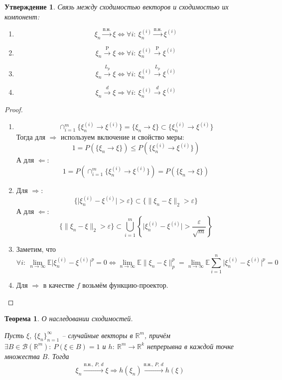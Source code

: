 \documentclass[a4paper,12pt]{article}
\renewcommand{\leq}{\ensuremath{\leqslant}}
\theoremstyle{plain}
\newtheorem{theorem}{Теорема}[section]
\newtheorem{proposition}{Утверждение}[section]
\theoremstyle{definition}
\theoremstyle{remark}
\begin{document}
\begin{proposition}
  Связь между сходимостью векторов и сходимостью их компонент:
  \begin{enumerate}
    \item \[
      \xi_n \overset{\text{п.н.}}{\to} \xi \Leftrightarrow \forall i :\: \xi_n^{(i)} \overset{\text{п.н.}}{\to} \xi^{(i)}
    \]
    \item \[
      \xi_n \overset{\text{P}}{\to} \xi \Leftrightarrow \forall i :\: \xi_n^{(i)} \overset{\text{P}}{\to} \xi^{(i)}
    \]
    \item \[
      \xi_n \overset{L_p}{\to} \xi \Leftrightarrow \forall i :\: \xi_n^{(i)} \overset{L_p}{\to} \xi^{(i)}
    \]
    \item \[
      \xi_n \overset{d}{\to} \xi \Rightarrow \forall i :\: \xi_n^{(i)} \overset{d}{\to} \xi^{(i)}
    \]
  \end{enumerate}
\end{proposition}

\begin{proof}
  \begin{enumerate}
    \item \[
      \cap_{i = 1}^m \{\xi_n^{(i)} \to \xi^{(i)}\} = \{\xi_n \to \xi\} \subset \{\xi_n^{(i)} \to \xi^{(i)}\}
    \]
    Тогда для $\Rightarrow$ используем включение и свойство меры:
    \[
      1 = P(\{\xi_n \to \xi\}) \leq P(\{\xi_n^{(i)} \to \xi^{(i)}\})
    \]
    А для $\Leftarrow$:
    \[
      1 = P(\cap_{i = 1}^m \{\xi_n^{(i)} \to \xi^{(i)}\}) = P(\{\xi_n \to \xi\})
    \]
    \item Для $\Rightarrow$:
    \[
      \{\vert \xi_n^{(i)} - \xi^{(i)}\vert > \varepsilon\} \subset \{\|\xi_n - \xi\|_2 > \varepsilon\}
    \]
    А для $\Leftarrow$:
    \[
      \{\|\xi_n - \xi\|_2 > \varepsilon\} \subset \bigcup_{i = 1}^m\left\{\vert \xi_n^{(i)} - \xi^{(i)}\vert > \frac{\varepsilon}{\sqrt{m}}\right\}
    \]
    \item Заметим, что
    \[
      \forall i :\: \lim_{n \to \infty}\mathbb{E}\vert \xi_n^{(i)} - \xi^{(i)}\vert^p = 0 \Leftrightarrow \lim_{n \to \infty}  \mathbb{E}\| \xi_n - \xi\|^p_p = \lim_{n \to \infty}  \mathbb{E}\sum_{i = 1}^n\vert \xi_n^{(i)} - \xi^{(i)}\vert^p = 0 
    \]
    \item Для $\Rightarrow$ в качестве $f$ возьмём функцию-проектор.
  \end{enumerate}
\end{proof}

\begin{theorem}
  О наследовании сходимостей.

  Пусть $\xi,\, \{\xi_n\}_{n = 1}^\infty$ -- случайные векторы в $\mathbb{R}^m$, причём $\exists B \in \mathcal{B}(\mathbb{R}^m) :\: P(\xi \in B) = 1$ и $h :\: \mathbb{R}^m \to \mathbb{R}^k$ непрерывна в каждой точке множества $B$. Тогда
  \begin{align}
    \xi_n \overset{\text{п.н.},\, P,\, d}{\to} \xi \Rightarrow h(\xi_n)\overset{\text{п.н.},\, P,\, d}{\to} h(\xi)
  \end{align}
\end{theorem}
\end{document}
